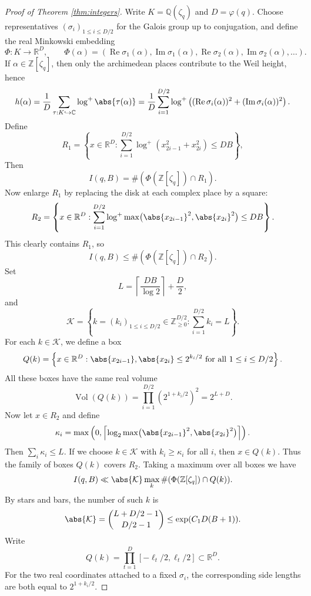 \documentclass{article}
\newcommand{\bC}{\mathbb{C}}
\newcommand{\bQ}{\mathbb{Q}}
\newcommand{\bR}{\mathbb{R}}
\newcommand{\bZ}{\mathbb{Z}}
\DeclareMathOperator{\Vol}{Vol}
\begin{document}
\begin{proof}[Proof of Theorem \ref{thm:integers}]
Write $K=\bQ(\zeta_q)$ and $D=\varphi(q)$. Choose representatives $(\sigma_i)_{1 \leq i \leq D/2}$ for the Galois group up to conjugation, and define the real Minkowski embedding
\[
\Phi:K \longrightarrow \bR^D,
\qquad
\Phi(\alpha)=
\left(\operatorname{Re} \sigma_1(\alpha),\operatorname{Im} \sigma_1(\alpha),
\operatorname{Re} \sigma_2(\alpha),\operatorname{Im} \sigma_2(\alpha),\dots
\right).
\]
If $\alpha \in \bZ[\zeta_q]$, then only the archimedean places contribute to the Weil height, hence
\[
h(\alpha)
=
\frac{1}{D}\sum_{\tau:K \hookrightarrow \bC} \log^+\abs{\tau(\alpha)}
=
\frac{1}{D}
\sum_{i=1}^{D/2}
\log^+\left((\operatorname{Re}\sigma_i(\alpha))^2+(\operatorname{Im}\sigma_i(\alpha))^2\right).
\]
Define
\[
R_1=
\left\{
x \in \bR^D :
\sum_{i=1}^{D/2}
\log^+\left(x_{2i-1}^2+x_{2i}^2\right)
\leq DB
\right\},
\]
Then
\[
I(q,B)=\#(\Phi(\bZ[\zeta_q]) \cap R_1).
\]
Now enlarge $R_1$ by replacing the disk at each complex place by a square:
\[
R_2=
\left\{
x \in \bR^D :
\sum_{i=1}^{D/2}
\log^+\max\bigl(\abs{x_{2i-1}}^2,\abs{x_{2i}}^2\bigr)
\leq DB
\right\}.
\]
This clearly contains $R_1$, so
\[
I(q,B)\leq \#(\Phi(\bZ[\zeta_q]) \cap R_2).
\]
Set
\[
L=\left\lceil \frac{DB}{\log 2} \right\rceil + \frac{D}{2},
\]
and
\[
\mathcal K=
\left\{
k=(k_i)_{1 \leq i \leq D/2} \in \bZ_{\geq 0}^{D/2} :
\sum_{i=1}^{D/2} k_i=L
\right\}.
\]
For each $k \in \mathcal K$, we define a box
\[
Q(k)=
\left\{
x \in \bR^D :
\abs{x_{2i-1}}, \abs{x_{2i}} \leq 2^{k_i/2}
\text{ for all } 1 \leq i \leq D/2
\right\}.
\]
All these boxes have the same real volume
\[
\Vol(Q(k))=\prod_{i=1}^{D/2} \left(2^{1+k_i/2}\right)^2 = 2^{L+D}.
\]
Now let $x \in R_2$ and define
\[
\kappa_i=
\max\left(0,\left\lceil
\log_2 \max\bigl(\abs{x_{2i-1}}^2,\abs{x_{2i}}^2\bigr)
\right\rceil\right).
\]
Then $\sum_i \kappa_i \leq L$. If we choose $k \in \mathcal K$ with $k_i \geq \kappa_i$ for all $i$, then $x \in Q(k)$. Thus the family of boxes $Q(k)$ covers $R_2$.
Taking a maximum over all boxes we have
\[
I(q,B)
\ll
\abs{\mathcal K}
\max_k \#(\Phi(\bZ[\zeta_q]) \cap Q(k)).
\]
By stars and bars, the number of such $k$ is
\[
\abs{\mathcal K}=\binom{L+D/2-1}{D/2-1} \leq \exp(C_1 D(B+1)).
\]
Write
\[
Q(k)=\prod_{t=1}^D [-\ell_t/2,\ell_t/2] \subset \bR^D.
\]
For the two real coordinates attached to a fixed $\sigma_i$, the corresponding side lengths are both equal to $2^{1+k_i/2}$.


\end{proof}
\end{document}
